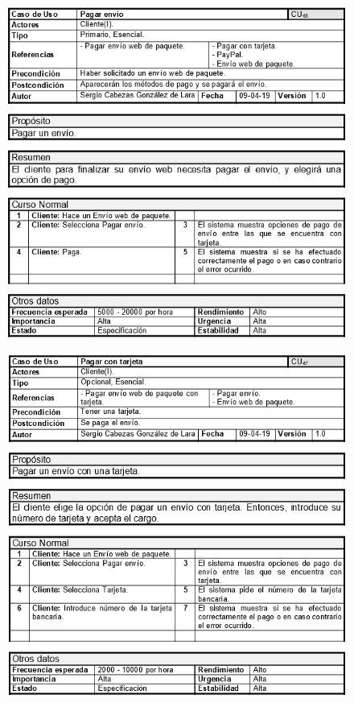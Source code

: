 \begin{figure}[H]
	\centering
	\includegraphics[width=16cm]{56}
\end{figure}
\begin{figure}[H]
	\centering
	\includegraphics[width=16cm]{57}
\end{figure}

